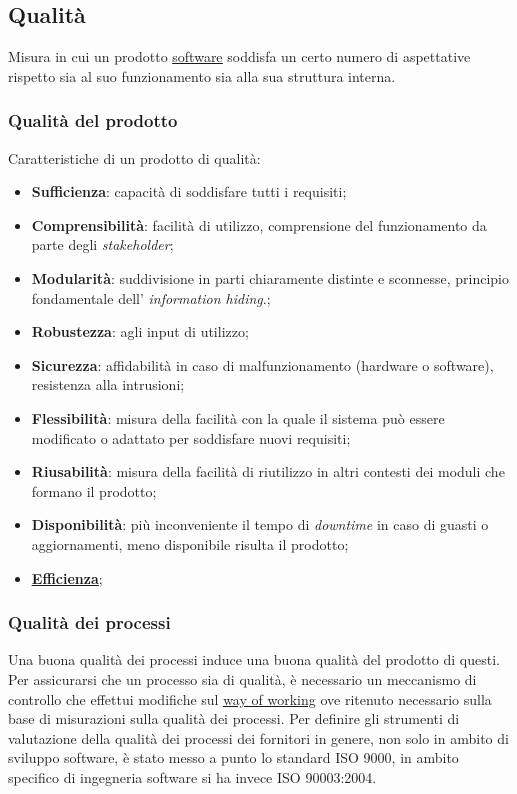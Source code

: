 	
	\subsection{Qualità}
	\label{sec:qualita}
	 Misura in cui un prodotto \underline{\hyperref[sec:prodottosoftware]{software}} soddisfa un certo numero di aspettative rispetto sia al suo funzionamento sia alla sua struttura interna.
	\subsubsection{Qualità del prodotto}
	\label{sec:qualitaprodotto}
	Caratteristiche di un prodotto di qualità:
	\begin{itemize}
	\item \textbf{Sufficienza}: capacità di soddisfare tutti i requisiti;
	\item \textbf{Comprensibilità}: facilità di utilizzo, comprensione del funzionamento da parte degli  \emph{stakeholder};
	\item \textbf{Modularità}: suddivisione in parti chiaramente distinte e sconnesse, principio fondamentale dell' \emph{information hiding}.;
	\item \textbf{Robustezza}: agli input di utilizzo;
	\item \textbf{Sicurezza}: affidabilità in caso di malfunzionamento (hardware o software), resistenza alla intrusioni;
	\item \textbf{Flessibilità}: misura della facilità con la quale il sistema può essere modificato o adattato per soddisfare nuovi requisiti;
	\item \textbf{Riusabilità}: misura della facilità di riutilizzo in altri contesti dei moduli che formano il prodotto;
	\item \textbf{Disponibilità}: più inconveniente il tempo di \emph{downtime} in caso di guasti o aggiornamenti, meno disponibile risulta il prodotto;
	\item \textbf{\underline{\hyperref[sec:efficienza]{Efficienza}}};
	\end{itemize}
	\subsubsection{Qualità dei processi}
	\label{sec:qualitaprocesso}
	Una buona qualità dei processi induce una buona qualità del prodotto di questi. Per assicurarsi che un processo sia di qualità, è necessario un meccanismo di controllo che effettui modifiche sul \underline{\hyperref[sec:wow]{\underline{\hyperref[sec:wow]{way of working}}}} ove ritenuto necessario sulla base di misurazioni sulla qualità dei processi. Per definire gli strumenti di valutazione della qualità dei processi dei fornitori in genere, non solo in ambito di sviluppo software, è stato messo a punto lo standard ISO 9000, in ambito specifico di ingegneria software si ha invece ISO 90003:2004.

